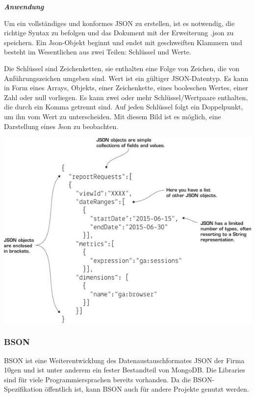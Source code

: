 \textit{\textbf{Anwendung}}

Um ein vollständiges und konformes JSON zu erstellen, ist es notwendig, die richtige Syntax zu befolgen und das Dokument mit der Erweiterung .json zu speichern. Ein Json-Objekt beginnt und endet mit geschweiften Klammern {} und besteht im Wesentlichen aus zwei Teilen: Schlüssel und Werte. 

Die Schlüssel sind Zeichenketten, sie enthalten eine Folge von Zeichen, die von Anführungszeichen umgeben sind. Wert ist ein gültiger JSON-Datentyp. Es kann in Form eines Arrays, Objekts, einer Zeichenkette, eines booleschen Wertes, einer Zahl oder null vorliegen. Es kann zwei oder mehr Schlüssel/Wertpaare enthalten, die durch ein Komma getrennt sind. Auf jeden Schlüssel folgt ein Doppelpunkt, um ihn vom Wert zu unterscheiden. Mit diesem Bild ist es möglich, eine Darstellung eines Json zu beobachten. 

\begin{center}
\includegraphics[scale=1]{images/Darstellung_eines_JSON-Objekts} \cite{json_img}
\end{center}

\subsubsection{BSON}

\ac{BSON} ist eine Weiterentwicklung des Datenaustauschformates JSON der Firma 10gen und ist unter anderem ein fester Bestandteil von MongoDB. Die Libraries sind für viele Programmiersprachen bereits vorhanden. Da die BSON-Spezifikation öffentlich ist, kann BSON auch für andere Projekte genutzt werden.\cite{thKloeln}

